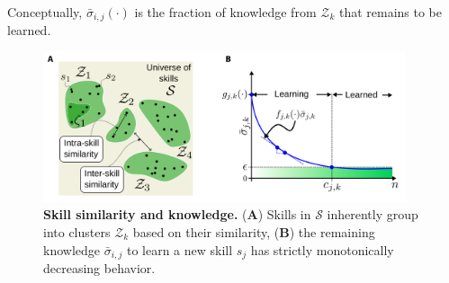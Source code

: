 \documentclass[12pt]{article}
\begin{document}
Conceptually, $\bar{\sigma}_ {i,j}\left(\cdot\right)$ is the fraction of knowledge from ${\mathcal{Z}_k}$ that remains to be learned.


\begin{figure}[!t]
	\centering
	\includegraphics[width=0.95\textwidth]{fig/skill_similarity_and_knowledge.png}
	\caption{\label{fig:skill_similarity_and_knowledge} \textbf{Skill similarity and knowledge.} (\textbf{A}) Skills in $\mathcal{S}$ inherently group into clusters $\mathcal{Z}_k$ based on their similarity, (\textbf{B}) the remaining knowledge $\bar{\sigma}_{i,j}$ to learn a new skill $s_{j}$ has strictly monotonically decreasing behavior.}
\end{figure}
\end{document}
